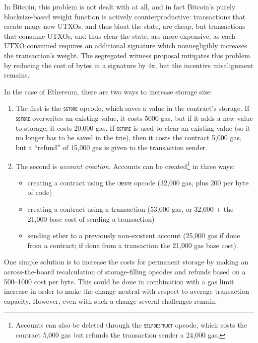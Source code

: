 \documentclass[12pt, final]{article}
\newcommand{\opcode}[1]{\textsc{\texttt{#1}}}
\begin{document}
In Bitcoin, this problem is not dealt with at all, and in fact Bitcoin's purely blocksize-based weight function is actively counterproductive: transactions that create many new UTXOs, and thus bloat the state, are cheap, but transactions that consume UTXOs, and thus clear the state, are more expensive, as each UTXO consumed requires an additional signature which nonnegligibly increases the transaction's weight. The segregated witness proposal mitigates this problem by reducing the cost of bytes in a signature by 4x, but the incentive misalignment remains.

In the case of Ethereum, there are two ways to increase storage size:

\begin{enumerate}
    \item The first is the \opcode{sstore} opcode, which saves a value in the contract's storage. If \opcode{sstore} overwrites an existing value, it costs 5000 gas, but if it adds a new value to storage, it costs 20,000 gas. If \opcode{sstore} is used to clear an existing value (so it no longer has to be saved in the trie), then it costs the contract 5,000 gas, but a ``refund'' of 15,000 gas is given to the transaction sender.

    \item The second is \emph{account creation}. Accounts can be created\footnote{Accounts can also be deleted through the \opcode{selfdestruct} opcode, which costs the contract 5,000 gas but refunds the transaction sender a 24,000 gas.} in three ways:

    \begin{itemize}
        \item creating a contract using the \opcode{create} opcode (32,000 gas, plus 200 per byte of code)
        \item creating a contract using a transaction (53,000 gas, or 32,000 + the 21,000 base cost of sending a transaction)
        \item sending ether to a previously non-existent account (25,000 gas if done from a contract; if done from a transaction the 21,000 gas base cost).

    \end{itemize}

\end{enumerate}


One simple solution is to increase the costs for permanent storage by making an across-the-board recalculation of storage-filling opcodes and refunds based on a 500--1000 cost per byte. This could be done in combination with a gas limit increase in order to make the change neutral with respect to average transaction capacity. However, even with such a change several challenges remain.
\end{document}
